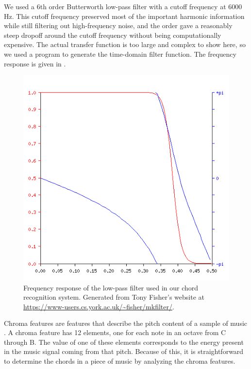 \documentclass[journal]{IEEEtran}
\begin{document}
We used a 6th order Butterworth low-pass filter with a cutoff frequency at 6000 Hz.
This cutoff frequency preserved most of the important harmonic information while still filtering out high-frequency noise, and the order gave a reasonably steep dropoff around the cutoff frequency without being computationally expensive.
The actual transfer function is too large and complex to show here, so we used a program to generate the time-domain filter function.
The frequency response is given in .

\begin{figure}[t]
    \centering
    \includegraphics[width=\linewidth]{../Figures/frequency_response}
    \caption{Frequency response of the low-pass filter used in our chord recognition system.
    Generated from Tony Fisher's website at \url{https://www-users.cs.york.ac.uk/~fisher/mkfilter/}.}
    \label{fig:frequency_response}
\end{figure}

Chroma features are features that describe the pitch content of a sample of music \cite{jiang}.
A chroma feature has 12 elements, one for each note in an octave from C through B.
The value of one of these elements corresponds to the energy present in the music signal coming from that pitch.
Because of this, it is straightforward to determine the chords in a piece of music by analyzing the chroma features.
\end{document}

